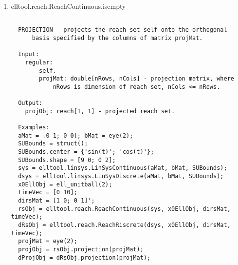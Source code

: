 \begin{enumerate}
\begin{lstlisting}
  GET_SYSTEM - returns the linear system for which the reach set is
               computed.

  Input:
    regular:
        self.

  Output:
    linSys: elltool.linsys.LinSys[1, 1] - linear system object.

  Example:
  aMat = [0 1; 0 0]; bMat = eye(2);
  SUBounds = struct();
  SUBounds.center = {'sin(t)'; 'cos(t)'};
  SUBounds.shape = [9 0; 0 2];
  sys = elltool.linsys.LinSysContinuous(aMat, bMat, SUBounds);
  x0EllObj = ell_unitball(2);
  timeVec = [0 10];
  dirsMat = [1 0; 0 1]';
  rsObj = elltool.reach.ReachContinuous(sys, x0EllObj, dirsMat, timeVec);
  linSys = rsObj.get_system()

  self =
  A:
       0     1
       0     0


  B:
       1     0
       0     1


  Control bounds:
     2-dimensional ellipsoid with center
      'sin(t)'
      'cos(t)'

     and shape matrix
       9     0
       0     2


  C:
       1     0
       0     1

  2-input, 2-output continuous-time linear time-invariant system of
          dimension 2:
  dx/dt  =  A x(t)  +  B u(t)
   y(t)  =  C x(t)

  dsys = elltool.linsys.LinSysDiscrete(aMat, bMat, SUBounds);
  dRsObj = elltool.reach.ReachDiscrete(sys, x0EllObj, dirsMat, timeVec);
  dRsObj.get_system();

Help for elltool.reach.ReachContinuous/intersect is inherited from superclass ELLTOOL.REACH.IREACH



\end{lstlisting}
\fontfamily{\familydefault}
\selectfont
\item {elltool.reach.ReachContinuous.isempty}
\selectfont
\begin{lstlisting}

  PROJECTION - projects the reach set self onto the orthogonal
      basis specified by the columns of matrix projMat.

  Input:
    regular:
        self.
        projMat: double[nRows, nCols] - projection matrix, where
            nRows is dimension of reach set, nCols <= nRows.

  Output:
    projObj: reach[1, 1] - projected reach set.

  Examples:
  aMat = [0 1; 0 0]; bMat = eye(2);
  SUBounds = struct();
  SUBounds.center = {'sin(t)'; 'cos(t)'};
  SUBounds.shape = [9 0; 0 2];
  sys = elltool.linsys.LinSysContinuous(aMat, bMat, SUBounds);
  dsys = elltool.linsys.LinSysDiscrete(aMat, bMat, SUBounds);
  x0EllObj = ell_unitball(2);
  timeVec = [0 10];
  dirsMat = [1 0; 0 1]';
  rsObj = elltool.reach.ReachContinuous(sys, x0EllObj, dirsMat, timeVec);
  dRsObj = elltool.reach.ReachRiscrete(dsys, x0EllObj, dirsMat, timeVec);
  projMat = eye(2);
  projObj = rsObj.projection(projMat);
  dProjObj = dRsObj.projection(projMat);



\end{lstlisting}
\end{enumerate}
